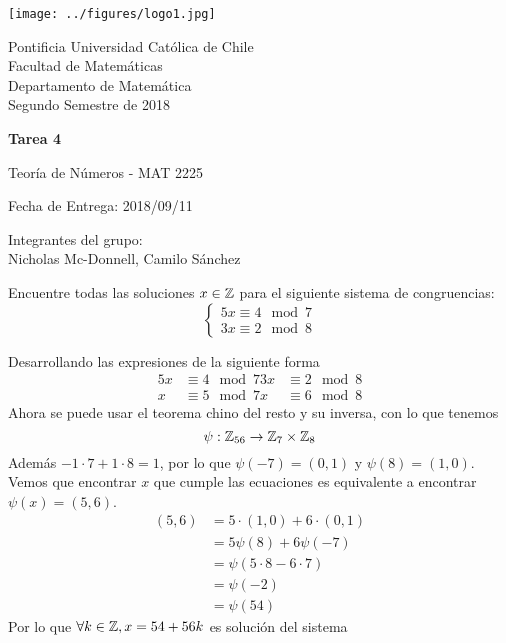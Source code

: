 


\begin{minipage}{2.5cm}
	\texttt{[image: ../figures/logo1.jpg]}
\end{minipage}
\begin{minipage}{13cm}
	\begin{flushleft}
		\raggedright
		{
			\noindent
			{\sc Pontificia Universidad Católica de Chile\\
				Facultad de Matemáticas\\
				Departamento de Matemática} \smallskip \\
			Segundo Semestre de 2018\\
		}
	\end{flushleft}
\end{minipage}

\vspace{2ex}
{\Large \centerline{\bf Tarea 4}}
{\large \centerline{Teoría de Números - MAT 2225}}
\centerline{Fecha de Entrega: 2018/09/11}

\begin{flushright}
	Integrantes del grupo:\\
	Nicholas Mc-Donnell, Camilo Sánchez
\end{flushright}

\begin{prob}[3 pts]
	Encuentre todas las soluciones $x\in\mathbb{Z}$ para el siguiente sistema de congruencias:
	\[\begin{cases}
			5x\equiv 4\mod 7 \\
			3x\equiv 2\mod 8
		\end{cases}\]
\end{prob}

\begin{sol}
	Desarrollando las expresiones de la siguiente forma
	\begin{align*}
		5x & \equiv 4\mod 7 3x & \equiv 2\mod 8 \\
		x  & \equiv 5\mod 7 x  & \equiv 6\mod 8
	\end{align*}
	Ahora se puede usar el teorema chino del resto y su inversa, con lo que tenemos
	\[\psi:\mathbb{Z}_{56}\rightarrow\mathbb{Z}_7\times\mathbb{Z}_8\]
	Además $-1\cdot 7+1\cdot 8=1$, por lo que $\psi(-7)=(0,1)$ y $\psi(8)=(1,0)$. Vemos que encontrar $x$ que cumple las ecuaciones es equivalente a encontrar $\psi(x)=(5,6)$.
	\begin{align*}
		(5,6) & =5\cdot(1,0)+6\cdot(0,1) \\
		      & =5\psi(8)+6\psi(-7)      \\
		      & =\psi(5\cdot8-6\cdot7)   \\
		      & =\psi(-2)                \\
		      & =\psi(54)
	\end{align*}
	Por lo que $\forall k\in\mathbb{Z}, x=54+56k$ es solución del sistema
\end{sol}

